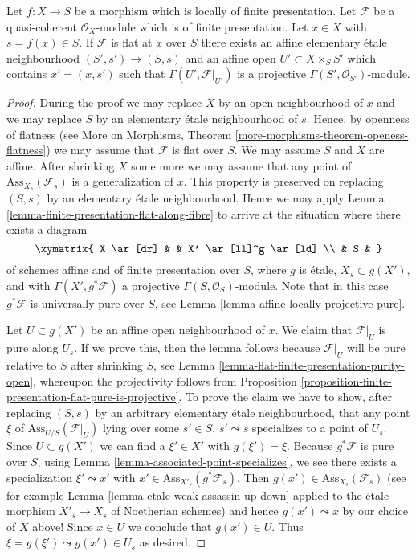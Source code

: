 \begin{lemma}
\label{lemma-flat-finite-presentation-affine-neighbourhood-projective}
Let $f : X \to S$ be a morphism which is locally of finite presentation.
Let $\mathcal{F}$ be a quasi-coherent $\mathcal{O}_X$-module which is
of finite presentation. Let $x \in X$ with $s = f(x) \in S$.
If $\mathcal{F}$ is flat at $x$ over $S$ there exists an affine
elementary \'etale neighbourhood $(S', s') \to (S, s)$ and
an affine open $U' \subset X \times_S S'$ which contains $x' = (x, s')$
such that $\Gamma(U', \mathcal{F}|_{U'})$ is a projective
$\Gamma(S', \mathcal{O}_{S'})$-module.
\end{lemma}

\begin{proof}
During the proof we may replace $X$ by an open neighbourhood of $x$
and we may replace $S$ by an elementary \'etale neighbourhood of $s$.
Hence, by openness of flatness (see
More on Morphisms, Theorem \ref{more-morphisms-theorem-openess-flatness})
we may assume that $\mathcal{F}$ is flat over $S$.
We may assume $S$ and $X$ are affine.
After shrinking $X$ some more we may assume that any
point of $\text{Ass}_{X_s}(\mathcal{F}_s)$ is a generalization of $x$.
This property is preserved on replacing $(S, s)$ by an elementary
\'etale neighbourhood. Hence we may apply
Lemma \ref{lemma-finite-presentation-flat-along-fibre}
to arrive at the situation where there exists a diagram
$$
\xymatrix{
X \ar[dr] & & X' \ar[ll]^g \ar[ld] \\
& S &
}
$$
of schemes affine and of finite presentation over $S$,
where $g$ is \'etale, $X_s \subset g(X')$, and with
$\Gamma(X', g^*\mathcal{F})$ a projective $\Gamma(S, \mathcal{O}_S)$-module.
Note that in this case $g^*\mathcal{F}$ is universally pure over $S$, see
Lemma \ref{lemma-affine-locally-projective-pure}.

\medskip\noindent
Let $U \subset g(X')$ be an affine open neighbourhood of $x$.
We claim that $\mathcal{F}|_U$ is pure along $U_s$. If we prove this, then
the lemma follows because $\mathcal{F}|_U$ will be pure relative to $S$
after shrinking $S$, see
Lemma \ref{lemma-flat-finite-presentation-purity-open},
whereupon the projectivity follows from
Proposition \ref{proposition-finite-presentation-flat-pure-is-projective}.
To prove the claim we have to show, after replacing $(S, s)$
by an arbitrary elementary \'etale neighbourhood, that any point $\xi$ of
$\text{Ass}_{U/S}(\mathcal{F}|_U)$ lying over some
$s' \in S$, $s' \leadsto s$ specializes to a point of $U_s$.
Since $U \subset g(X')$ we can find a $\xi' \in X'$ with
$g(\xi') = \xi$. Because $g^*\mathcal{F}$ is pure over $S$, using
Lemma \ref{lemma-associated-point-specializes},
we see there exists a specialization $\xi' \leadsto x'$ with
$x' \in \text{Ass}_{X'_s}(g^*\mathcal{F}_s)$. Then
$g(x') \in \text{Ass}_{X_s}(\mathcal{F}_s)$ (see for example
Lemma \ref{lemma-etale-weak-assassin-up-down}
applied to the \'etale morphism $X'_s \to X_s$ of Noetherian schemes)
and hence $g(x') \leadsto x$ by our choice of $X$ above! Since
$x \in U$ we conclude that $g(x') \in U$. Thus
$\xi = g(\xi') \leadsto g(x') \in U_s$ as desired.
\end{proof}

